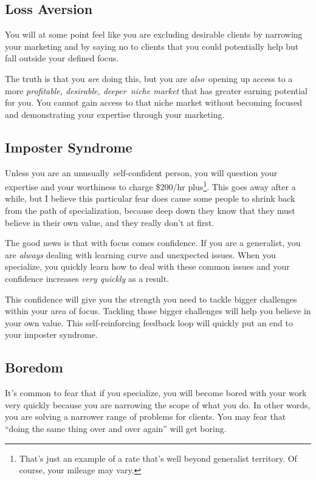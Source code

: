 \subsection{Loss Aversion}

You will at some point feel like you are excluding desirable clients by narrowing your marketing and by saying no to clients that you could potentially help but fall outside your defined focus.

The truth is that you \emph{are} doing this, but you are \emph{also} opening up access to a more \emph{profitable, desirable, deeper niche market} that has greater earning potential for you. You cannot gain access to that niche market without becoming focused and demonstrating your expertise through your marketing.

\subsection{Imposter Syndrome}

Unless you are an unusually self-confident person, you will question your expertise and your worthiness to charge \$200/hr plus\footnote{That's just an example of a rate that's well beyond generalist territory. Of course, your mileage may vary.}. This goes away after a while, but I believe this particular fear does cause some people to shrink back from the path of specialization, because deep down they know that they must believe in their own value, and they really don't at first.

The good news is that with focus comes confidence. If you are a generalist, you are \emph{always} dealing with learning curve and unexpected issues. When you specialize, you quickly learn how to deal with these common issues and your confidence increases \emph{very quickly} as a result.

This confidence will give you the strength you need to tackle bigger challenges within your area of focus. Tackling those bigger challenges will help you believe in your own value. This self-reinforcing feedback loop will quickly put an end to your imposter syndrome.

\subsection{Boredom}

It's common to fear that if you specialize, you will become bored with your work very quickly because you are narrowing the scope of what you do. In other words, you are solving a narrower range of problems for clients. You may fear that ``doing the same thing over and over again'' will get boring.

